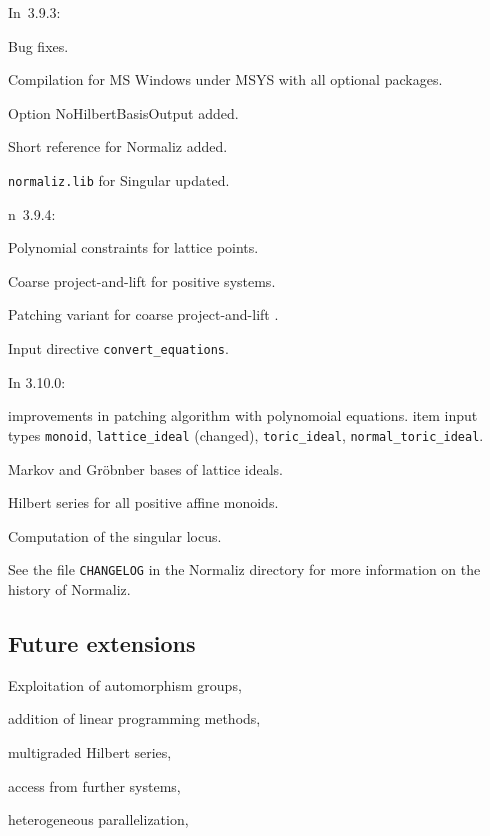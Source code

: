 In~3.9.3:

\begin{arab}
	\item Bug fixes.
	\item Compilation for MS Windows under MSYS with all optional packages.
	\item Option NoHilbertBasisOutput added.
	\item Short reference for Normaliz added.
	\item \verb|normaliz.lib| for Singular updated.
\end{arab}

n~3.9.4:

\begin{arab}
	\item Polynomial constraints  for lattice points.
	\item Coarse project-and-lift for positive systems.
	\item Patching variant for coarse project-and-lift .
	\item Input directive \verb|convert_equations|.
\end{arab}

In 3.10.0:

\begin{arab}
	\item improvements in patching algorithm with polynomoial equations.
	item input types \verb|monoid|, \verb|lattice_ideal| (changed), \verb|toric_ideal|, \verb|normal_toric_ideal|.
	\item  Markov and Gröbnber bases of lattice ideals.
	\item Hilbert series for all positive affine monoids.
	\item Computation of the singular locus.
\end{arab}

See the file \verb|CHANGELOG| in the Normaliz directory for more information on the history of Normaliz.


\subsection{Future extensions}

\begin{arab}
	\item Exploitation of automorphism groups,
	\item addition of linear programming methods,
	\item multigraded Hilbert series,
	\item access from further systems,
	\item heterogeneous parallelization,
\end{arab}

